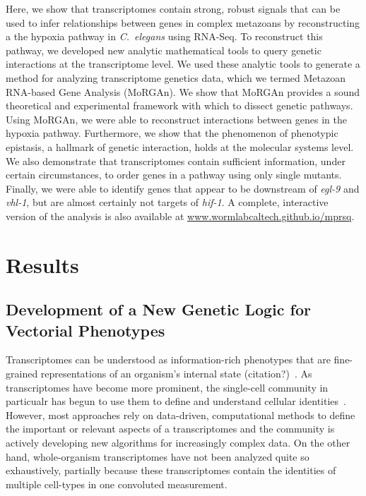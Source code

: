 \documentclass[9pt,twocolumn,twoside]{pnas-new}
\newcommand{\cel}{\emph{C.~elegans}}
\newcommand{\egl}{\emph{egl-9}}
\newcommand{\vhl}{\emph{vhl-1}}
\newcommand{\hif}{\emph{hif-1}}
\begin{document}
Here, we show that transcriptomes contain strong, robust signals that can be
used to infer relationships between genes in complex metazoans by reconstructing
a the hypoxia pathway in \cel{} using RNA-Seq. To reconstruct this pathway, we
developed new analytic mathematical tools to query genetic interactions at the
transcriptome level. We used these analytic tools to generate a method for
analyzing transcriptome genetics data, which we termed Metazoan RNA-based Gene
Analysis (MoRGAn).
We show that MoRGAn provides a sound theoretical and experimental framework with
which to dissect genetic pathways. Using MoRGAn, we were able to reconstruct
interactions between genes in the hypoxia pathway.
Furthermore, we show that the phenomenon of phenotypic epistasis, a hallmark of
genetic interaction, holds at the molecular systems level.
We also demonstrate that transcriptomes contain sufficient information, under
certain circumstances, to order genes in a pathway using only single mutants.
Finally, we were able to identify genes that appear to be downstream of \egl{}
and \vhl{}, but are almost certainly not targets of \hif{}.
A complete, interactive version of the analysis is also available at
\url{www.wormlabcaltech.github.io/mprsq}.

\section*{Results}
\subsection{Development of a New Genetic Logic for Vectorial Phenotypes}
\label{sec:genetic_logic}

Transcriptomes can be understood as information-rich phenotypes that are
fine-grained representations of an organism's internal state (citation?)~\cite{}.
As transcriptomes have become more prominent, the single-cell community in
particualr has begun to use them to define and understand cellular
identities~\cite{}. However, most approaches rely on data-driven, computational
methods to define the important or relevant aspects of a transcriptomes and the
community is actively developing new algorithms for increasingly complex data.
On the other hand, whole-organism transcriptomes have not been analyzed quite
so exhaustively, partially because these transcriptomes contain the identities
of multiple cell-types in one convoluted measurement.
\end{document}
